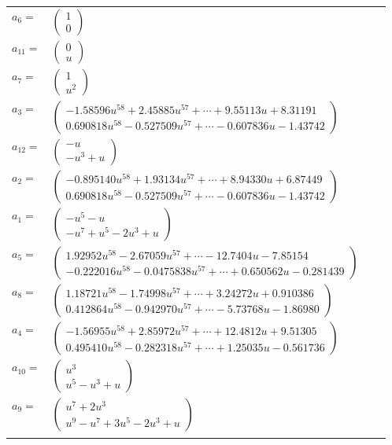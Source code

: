 \documentclass[1p]{elsarticle_modified}
\theoremstyle{definition}
\begin{document}
\begin{tabular}{m{7pt} m{180pt} m{7pt} m{180pt} }
\flushright $a_{6}=$&$\begin{pmatrix}1\\0\end{pmatrix}$ \\
\flushright $a_{11}=$&$\begin{pmatrix}0\\u\end{pmatrix}$ \\
\flushright $a_{7}=$&$\begin{pmatrix}1\\u^2\end{pmatrix}$ \\
\flushright $a_{3}=$&$\begin{pmatrix}-1.58596 u^{58}+2.45885 u^{57}+\cdots+9.55113 u+8.31191\\0.690818 u^{58}-0.527509 u^{57}+\cdots-0.607836 u-1.43742\end{pmatrix}$ \\
\flushright $a_{12}=$&$\begin{pmatrix}- u\\- u^3+u\end{pmatrix}$ \\
\flushright $a_{2}=$&$\begin{pmatrix}-0.895140 u^{58}+1.93134 u^{57}+\cdots+8.94330 u+6.87449\\0.690818 u^{58}-0.527509 u^{57}+\cdots-0.607836 u-1.43742\end{pmatrix}$ \\
\flushright $a_{1}=$&$\begin{pmatrix}- u^5- u\\- u^7+u^5-2 u^3+u\end{pmatrix}$ \\
\flushright $a_{5}=$&$\begin{pmatrix}1.92952 u^{58}-2.67059 u^{57}+\cdots-12.7404 u-7.85154\\-0.222016 u^{58}-0.0475838 u^{57}+\cdots+0.650562 u-0.281439\end{pmatrix}$ \\
\flushright $a_{8}=$&$\begin{pmatrix}1.18721 u^{58}-1.74998 u^{57}+\cdots+3.24272 u+0.910386\\0.412864 u^{58}-0.942970 u^{57}+\cdots-5.73768 u-1.86980\end{pmatrix}$ \\
\flushright $a_{4}=$&$\begin{pmatrix}-1.56955 u^{58}+2.85972 u^{57}+\cdots+12.4812 u+9.51305\\0.495410 u^{58}-0.282318 u^{57}+\cdots+1.25035 u-0.561736\end{pmatrix}$ \\
\flushright $a_{10}=$&$\begin{pmatrix}u^3\\u^5- u^3+u\end{pmatrix}$ \\
\flushright $a_{9}=$&$\begin{pmatrix}u^7+2 u^3\\u^9- u^7+3 u^5-2 u^3+u\end{pmatrix}$\\&\end{tabular}
\end{document}
